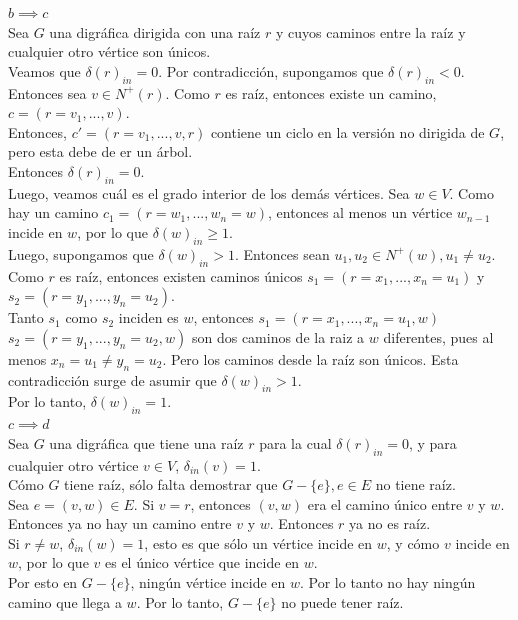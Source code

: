 \documentclass[12pt,a4paper]{report}
\begin{document}
\begin{enumerate}
{			$b \implies c$\\
			Sea $G$ una digráfica dirigida con una raíz $r$ y cuyos caminos entre la raíz y
			cualquier otro vértice son únicos.\\
			Veamos que $\delta(r)_{in} = 0$. Por contradicción, supongamos que
			$\delta(r)_{in} < 0$. Entonces sea $v \in N^+(r)$. Como $r$ es raíz,
			entonces existe un camino, $c = (r = v_1, ..., v)$. \\
			Entonces, $c' = (r = v_1, ..., v, r)$ contiene un ciclo en la versión no
			dirigida de $G$, pero esta debe de er un árbol.\\
			Entonces $\delta(r)_{in} = 0$.\\
			Luego, veamos cuál es el grado interior de los demás vértices.
			Sea $w \in V$. Como hay un camino $c_1 = (r = w_1, ..., w_n = w)$,
			entonces al menos un vértice $w_{n-1}$ incide en $w$, por lo que
			$\delta(w)_{in} \geq 1$.\\
			Luego, supongamos que $\delta(w)_{in} > 1$. Entonces sean
			 $u_1, u_2 \in N^+(w), u_1 \neq u_2$.\\
			Como $r$ es raíz, entonces existen caminos únicos $s_1 = (r = x_1, ..., x_n = u_1)$
			y $s_2 = (r = y_1, ..., y_n = u_2)$.\\
			Tanto $s_1$ como  $s_2$ inciden es $w$, entonces
			$s_1 = (r = x_1, ..., x_n = u_1, w)$ $s_2 = (r = y_1, ..., y_n = u_2, w)$
			son dos caminos de la raiz a $w$ diferentes, pues al menos $x_n = u_1 \neq y_n = u_2$.
			Pero los caminos desde la raíz son únicos. Esta contradicción surge de
			asumir que $\delta(w)_{in} > 1$.\\
			Por lo tanto, $\delta(w)_{in} = 1$.\\

			$c \implies d$\\
			Sea $G$ una digráfica que tiene una raíz $r$ para la cual $\delta(r)_{in} = 0$,
			y para cualquier otro vértice  $v \in V$, $\delta_{in}(v) = 1$.\\
			Cómo $G$ tiene raíz, sólo falta demostrar que $G-\{e\}, e \in E$ no tiene
			raíz.\\
			Sea $e = (v, w) \in E$. Si $v = r$, entonces $(v, w)$ era el camino único
			entre $v$ y $w$. Entonces ya no hay un camino entre $v$ y $w$. Entonces
			$r$ ya no es raíz.\\
			Si $r \neq w$, $\delta_{in}(w) = 1$, esto es que sólo un vértice
			incide en $w$, y cómo $v$ incide en $w$, por lo que $v$ es el único vértice
			que incide en $w$.\\
			Por esto en $G-\{e\}$, ningún vértice incide en $w$. Por lo tanto
			no hay ningún camino que llega a $w$.
			Por lo tanto, $G-\{e\}$ no puede tener raíz.\\

}
\end{enumerate}
\end{document}
